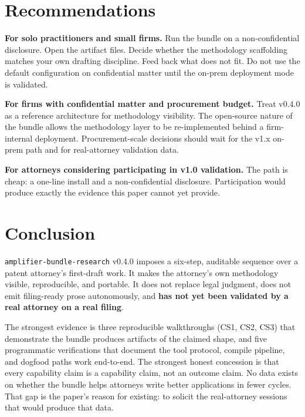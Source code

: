\documentclass[11pt,letterpaper]{article}
\begin{document}
\section{Recommendations}

\textbf{For solo practitioners and small firms.} Run the bundle on a
non-confidential disclosure. Open the artifact files. Decide whether
the methodology scaffolding matches your own drafting discipline.
Feed back what does not fit. Do not use the default configuration on
confidential matter until the on-prem deployment mode is validated.

\textbf{For firms with confidential matter and procurement budget.}
Treat v0.4.0 as a reference architecture for methodology visibility.
The open-source nature of the bundle allows the methodology layer to
be re-implemented behind a firm-internal deployment. Procurement-scale
decisions should wait for the v1.x on-prem path and for
real-attorney validation data.

\textbf{For attorneys considering participating in v1.0 validation.}
The path is cheap: a one-line install and a non-confidential
disclosure. Participation would produce exactly the evidence this
paper cannot yet provide.

\section{Conclusion}

\texttt{amplifier-bundle-research} v0.4.0 imposes a six-step,
auditable sequence over a patent attorney's first-draft work. It
makes the attorney's own methodology visible, reproducible, and
portable. It does not replace legal judgment, does not emit
filing-ready prose autonomously, and \textbf{has not yet been
validated by a real attorney on a real filing}.

The strongest evidence is three reproducible walkthroughs (CS1, CS2,
CS3) that demonstrate the bundle produces artifacts of the claimed
shape, and five programmatic verifications that document the tool
protocol, compile pipeline, and dogfood paths work end-to-end. The
strongest honest concession is that every capability claim is a
capability claim, not an outcome claim. No data exists on whether the
bundle helps attorneys write better applications in fewer cycles.
That gap is the paper's reason for existing: to solicit the
real-attorney sessions that would produce that data.
\end{document}
